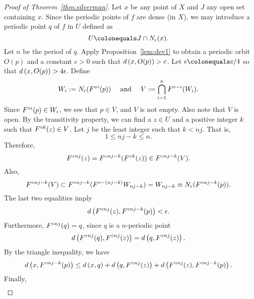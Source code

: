 \documentclass[12pt,draft,twoside]{book}
\begin{document}
\begin{proof}[Proof of Theorem~\ref{thm:silverman}]
  Let $x$ be any point of $X$ and $J$ any open set containing $x$.
  Since the periodic points of $f$ are dense (in $X$), we may introduce a periodic point
  $q$ of $f$ in $U$ defined as
  \begin{equation*}
    U \ceq J\cap \oball{\epsilon}{x}.
  \end{equation*}
  Let $n$ be the period of $q$.
  Apply Proposition~\ref{lem:dev1} to obtain a periodic orbit $O(p)$ and a constant $c > 0$ such that $d\left( x, O(p) \right) > c$.
  Let $\epsilon \ceq c/4$ so that $d\left( x, O(p) \right) > 4\epsilon$.
  Define
  \begin{equation*}
    W_i := N_{\epsilon}(F^{\circ i}(p)) \quad\text{ and }\quad V := \bigcap\limits_{i = 1}^{n} F^{\circ -i}(W_i).
  \end{equation*}
  Since $F^{\circ i}(p) \in W_i$, we see that $p \in V$, and $V$ is not empty. 
  Also note that $V$ is open.
  By the transitivity property, we can find a $z\in U$ and a positive integer $k$ such that
  $F^{\circ k}(z) \in V$. Let $j$ be the least integer such that $k < nj$. 
  That is,
  \begin{equation*}
    1 \leq nj - k \leq n.
  \end{equation*}
  Therefore,
  \begin{equation*}
    F^{\circ nj} (z) = F^{\circ nj - k} (F^{\circ k}(z)) \in F^{\circ nj-k}(V).
  \end{equation*}
  Also,
  \begin{equation*}
    F^{\circ nj - k}(V) \subset F^{\circ nj - k}(F^{\circ -(nj - k)} W_{nj-k}) 
    = W_{nj-k}
    \equiv N_{\epsilon}(F^{\circ nj-k}(p)).
  \end{equation*}
  The last two equalities imply
  \begin{equation*}
    d\left( F^{\circ nj}(z), F^{\circ nj - k}(p) \right) < \epsilon.
  \end{equation*}
  Furthermore, $F^{\circ nj}(q) = q$, since $q$ is a $n$-periodic point 
  \begin{equation*}
    d\left( F^{\circ nj}(q), F^{\circ nj}(z) \right) = d\left( q, F^{\circ nj}(z) \right).
  \end{equation*}
  By the triangle inequality, we have
  \begin{equation*}
    d\left( x, F^{\circ nj-k}(p) \right) \leq d\left( x,q \right) + d\left( q, F^{\circ nj}(z) \right) + d\left( F^{\circ nj}(z), F^{\circ nj - k}(p) \right).
  \end{equation*}
  Finally, 
  \begin{align*}

\end{align*}
\end{proof}
\end{document}
